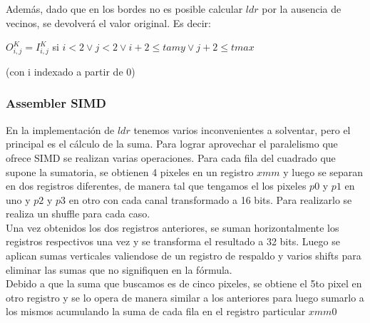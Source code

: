Además, dado que en los bordes no es posible calcular $ldr$ por la ausencia de vecinos, se devolverá
el valor original. Es decir:

\begin{center}
$O_{i,j}^{K} = I_{i,j}^{K}$ si $i<2 \vee j<2 \vee i+2 \leq tamy \vee j +2 \leq tmax$
\end{center}

(con i indexado a partir de 0)

\subsubsection{Assembler SIMD}

En la implementación de $ldr$ tenemos varios inconvenientes a solventar, pero el principal es el cálculo de la suma. Para lograr aprovechar el paralelismo que ofrece SIMD se realizan varias operaciones.
Para cada fila del cuadrado que supone la sumatoria, se obtienen 4 pixeles en un registro $xmm$ y luego se separan en dos registros diferentes, de manera tal que tengamos el los pixeles $p0$ y $p1$ en uno y $p2$ y $p3$ en otro con cada canal transformado a 16 bits. Para realizarlo se realiza un shuffle para cada caso.\\

Una vez obtenidos los dos registros anteriores, se suman horizontalmente los registros respectivos una vez y se transforma el resultado a 32 bits. Luego se aplican sumas verticales valiendose de un registro de respaldo y varios shifts para eliminar las sumas que no signifiquen en la fórmula.\\

Debido a que la suma que buscamos es de cinco pixeles, se obtiene el 5to pixel en otro registro y se lo opera de manera similar a los anteriores para luego sumarlo a los mismos acumulando la suma de cada fila en el registro particular $xmm0$

